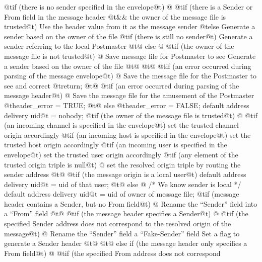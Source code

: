 {{{    @t{if (}there is no sender specified in the envelope@t{) @{}
        @t{if (}there is a Sender or From field in the message header
            @t{&&} the owner of the message file is trusted@t{)}
            Use the header value from it as the message sender
        @t{else}
            Generate a sender based on the owner of the file
        @t{if (}there is still no sender@t{)}
            Generate a sender referring to the local Postmaster
    @t{@} else @{}
        @t{if (}the owner of the message file is not trusted@t{) @{}
            Save message file for Postmaster to see
            Generate a sender based on the owner of the file
        @t{@}}
    @t{@}}
    @t{if (}an error occurred during parsing of the message envelope@t{) @{}
        Save the message file for the Postmaster to see and correct
        @t{return;}
    @t{@}}
    @t{if (}an error occurred during parsing of the message header@t{) @{}
        Save the message file for the amusement of the Postmaster
        @t{header_error = TRUE;}
    @t{@} else}
        @t{header_error = FALSE;}
    default address delivery uid@t{ = nobody;}
    @t{if (}the owner of the message file is trusted@t{) @{}
        @t{if (}an incoming channel is specified in the envelope@t{)}
            set the trusted channel origin accordingly
        @t{if (}an incoming host is specified in the envelope@t{)}
            set the trusted host origin accordingly
        @t{if (}an incoming user is specified in the envelope@t{)}
            set the trusted user origin accordingly
        @t{if (}any element of the trusted origin triple is null@t{) @{}
            set the resolved origin triple by
                routing the sender address
        @t{@}}
        @t{if (}the message origin is a local user@t{)}
            default address delivery uid@t{ = uid of that user;}
    @t{@} else @{}
        /* We know sender is local */
        default address delivery uid@t{ = uid of owner of message file;}
        @t{if (}message header contains a Sender, but no From field@t{) @{}
            Rename the ``Sender'' field into a ``From'' field
        @t{@}}
        @t{if (}the message header specifies a Sender@t{) @{}
            @t{if (}the specified Sender address does not correspond
                to the resolved origin of the message@t{) @{}
                Rename the ``Sender'' field a ``Fake-Sender'' field
                Set a flag to generate a Sender header
            @t{@}}
        @t{@} else if (}the message header only specifies a From field@t{) @{}
            @t{if (}the specified From address does not correspond
}}}}}
